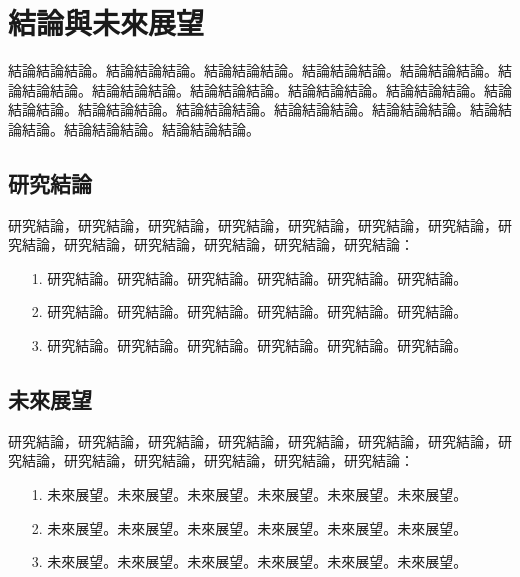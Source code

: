 \chapter{結論與未來展望}
\label{c:experiment}
結論結論結論。結論結論結論。結論結論結論。結論結論結論。結論結論結論。結論結論結論。結論結論結論。結論結論結論。結論結論結論。結論結論結論。結論結論結論。結論結論結論。結論結論結論。結論結論結論。結論結論結論。結論結論結論。結論結論結論。結論結論結論。

\section{研究結論}

研究結論，研究結論，研究結論，研究結論，研究結論，研究結論，研究結論，研究結論，研究結論，研究結論，研究結論，研究結論，研究結論：

\begin{itemize}
\item[1.] 研究結論。研究結論。研究結論。研究結論。研究結論。研究結論。
\end{itemize}

\begin{itemize}
\item[2.] 研究結論。研究結論。研究結論。研究結論。研究結論。研究結論。
\end{itemize}

\begin{itemize}
\item[3.] 研究結論。研究結論。研究結論。研究結論。研究結論。研究結論。
\end{itemize}

\section{未來展望}
研究結論，研究結論，研究結論，研究結論，研究結論，研究結論，研究結論，研究結論，研究結論，研究結論，研究結論，研究結論，研究結論：

\begin{itemize}
\item[1.] 未來展望。未來展望。未來展望。未來展望。未來展望。未來展望。
\end{itemize}

\begin{itemize}
\item[2.]  未來展望。未來展望。未來展望。未來展望。未來展望。未來展望。
\end{itemize}

\begin{itemize}
\item[3.] 未來展望。未來展望。未來展望。未來展望。未來展望。未來展望。
\end{itemize}